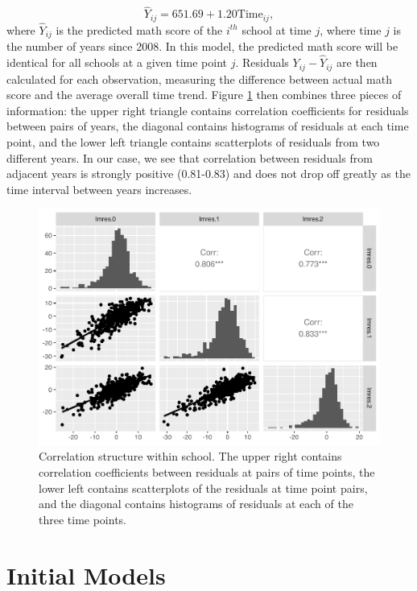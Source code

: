 \documentclass[
]{krantz}
\begin{document}
\begin{equation*}
\hat{Y}_{ij}=651.69+1.20\textrm{Time}_{ij},
\end{equation*}
where \(\hat{Y}_{ij}\) is the predicted math score of the \(i^{th}\) school at time \(j\), where time \(j\) is the number of years since 2008. In this model, the predicted math score will be identical for all schools at a given time point \(j\). Residuals \(Y_{ij}-\hat{Y}_{ij}\) are then calculated for each observation, measuring the difference between actual math score and the average overall time trend. Figure \ref{fig:lon-cor1} then combines three pieces of information: the upper right triangle contains correlation coefficients for residuals between pairs of years, the diagonal contains histograms of residuals at each time point, and the lower left triangle contains scatterplots of residuals from two different years. In our case, we see that correlation between residuals from adjacent years is strongly positive (0.81-0.83) and does not drop off greatly as the time interval between years increases.

\begin{figure}

{\centering \includegraphics[width=0.6\linewidth]{bookdown-BeyondMLR_files/figure-latex/lon-cor1-1} 

}

\caption{Correlation structure within school.  The upper right contains correlation coefficients between residuals at pairs of time points, the lower left contains scatterplots of the residuals at time point pairs, and the diagonal contains histograms of residuals at each of the three time points.}\label{fig:lon-cor1}
\end{figure}

\section{Initial Models}\label{lineartwostageerror}
\end{document}
